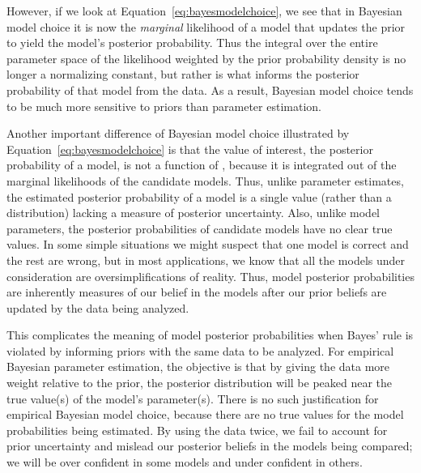 \documentclass[letterpaper,12pt]{article}
\begin{document}
\begin{linenumbers}

However, if we look at Equation~\ref{eq:bayesmodelchoice}, we see that in
Bayesian model choice it is now the \emph{marginal} likelihood of a model that
updates the prior to yield the model's posterior probability.
Thus the integral over the entire parameter space of the likelihood weighted by
the prior probability density is no longer a normalizing constant, but rather
is what informs the posterior probability of that model from the data.
As a result, Bayesian model choice tends to be much more sensitive to priors
than parameter estimation.

Another important difference of Bayesian model choice illustrated by
Equation~\ref{eq:bayesmodelchoice} is that the value of interest, the
posterior probability of a model, is not a function of \myTheta{}, because
it is integrated out of the marginal likelihoods of the candidate models.
Thus, unlike parameter estimates, the estimated posterior probability of a
model is a single value (rather than a distribution) lacking a measure of
posterior uncertainty.
Also, unlike model parameters, the posterior probabilities of candidate
models have no clear true values.
In some simple situations we might suspect that one model is correct and the
rest are wrong, but in most applications, we know that all the models under
consideration are oversimplifications of reality.
Thus, model posterior probabilities are inherently measures of our belief in
the models after our prior beliefs are updated by the data being analyzed.

This complicates the meaning of model posterior probabilities when Bayes' rule
is violated by informing priors with the same data to be analyzed.
For empirical Bayesian parameter estimation, the objective is that by giving the
data more weight relative to the prior, the posterior distribution will be
peaked near the true value(s) of the model's parameter(s).
There is no such justification for empirical Bayesian model choice, because
there are no true values for the model probabilities being estimated.
By using the data twice, we fail to account for prior uncertainty and mislead
our posterior beliefs in the models being compared; we will be over confident
in some models and under confident in others.


\end{linenumbers}
\end{document}

